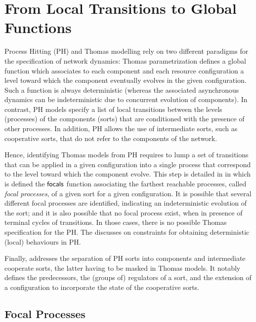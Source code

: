 \section{From Local Transitions to Global Functions}\label{sec:tr2global}

Process Hitting (PH) and Thomas modelling rely on two different paradigms for the specification of
network dynamics:
Thomas parametrization defines a global function
which associates to each component and each resource configuration a level toward which the component
eventually evolves in the given configuration.
Such a function is always deterministic (whereas the associated asynchronous dynamics can be
indeterministic due to concurrent evolution of components).
In contrast, 
PH models specify a list of local transitions between the levels (processes) of the components (sorts)
that are conditioned with the presence of other processes.
In addition, PH allows the use of intermediate sorts, such as cooperative sorts, that do not refer
to the components of the network.

Hence, identifying Thomas models from PH requires to lump a set of transitions that can be
applied in a given configuration into a single process that correspond to the level toward which the
component evolve.
This step is detailed in  in which is defined the $\mathsf{focals}$ function associating 
the farthest reachable processes, called \emph{focal processes}, of a given sort
for a given configuration.
It is possible that several different focal processes are identified, indicating an indeterministic
evolution of the sort;
and it is also possible that no focal process exist, when in presence of terminal cycles of
transitions.
In those cases, there is no possible Thomas specification for the PH.
The  discusses on constraints for obtaining deterministic
(local) behaviours in PH.

Finally,  addresses the separation of PH sorts into
components and intermediate cooperate sorts, the latter having to be masked in Thomas models.
It notably defines the predecessors, the (groups of) regulators of a
sort, and the extension of a configuration to incorporate the state of the
cooperative sorts.

\subsection{Focal Processes}\label{ssec:focal}

